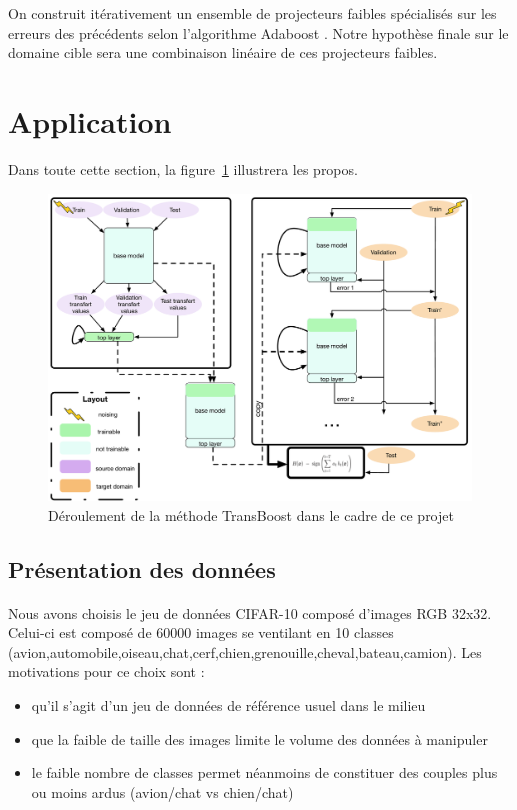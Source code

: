 \documentclass[11 pt]{article}
\begin{document}
On construit itérativement un ensemble de projecteurs faibles spécialisés sur les erreurs des précédents selon l'algorithme Adaboost \cite{boosting}. Notre hypothèse finale sur le domaine cible sera une combinaison linéaire de ces projecteurs faibles.

\section{Application}

Dans toute cette section, la figure~\ref{figRes} illustrera les propos.

\begin{figure}[H]
  \includegraphics[width=\textwidth]{fig1.pdf}
  \caption{Déroulement de la méthode TransBoost dans le cadre de ce projet}
  \label{figRes}
\end{figure}

\subsection{Présentation des données}
\paragraph{}Nous avons choisis le jeu de données CIFAR-10 composé d’images RGB 32x32. Celui-ci est composé de 60000 images se ventilant en 10 classes (avion,automobile,oiseau,chat,cerf,chien,grenouille,cheval,bateau,camion). Les motivations pour ce choix sont :\\ \medskip
\begin{itemize}
  \item qu’il s’agit d’un jeu de données de référence usuel dans le milieu
  \item que la faible de taille des images limite le volume des données à manipuler
  \item le faible nombre de classes permet néanmoins de constituer des couples plus ou moins ardus (avion/chat vs chien/chat)
\end{itemize}
\end{document}
